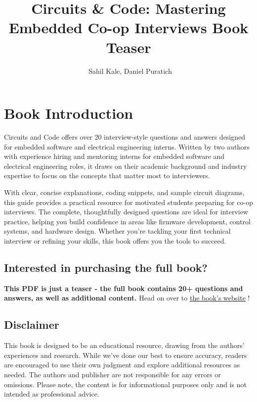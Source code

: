 \documentclass[letterpaper,11pt]{article}
\newcommand{\bluehref}[2]{%
    \textcolor{blue}{\underline{\href{#1}{#2}}}%
}
\newcommand{\newnoindentpara}{
    \par
    \noindent
}
\begin{document}
\title{Circuits \& Code: Mastering Embedded Co-op Interviews \newline Book Teaser}
\author{\textcopyright \ Sahil Kale, Daniel Puratich}
\setlength{\droptitle}{0.3\textheight} %
\maketitle %
\thispagestyle{empty} %
\newpage

\tableofcontents
\newpage

\section{Book Introduction}
Circuits and Code offers over 20 interview-style questions and answers designed for embedded software and electrical engineering interns. Written by two authors with experience hiring and mentoring interns for embedded software and electrical engineering roles, it draws on their academic background and industry expertise to focus on the concepts that matter most to interviewers. \newline

\newnoindentpara With clear, concise explanations, coding snippets, and sample circuit diagrams, this guide provides a practical resource for motivated students preparing for co-op interviews. The complete, thoughtfully designed questions are ideal for interview practice, helping you build confidence in areas like firmware development, control systems, and hardware design. Whether you’re tackling your first technical interview or refining your skills, this book offers you the tools to succeed.

\subsection{Interested in purchasing the full book?}
\textbf{This PDF is just a teaser - the full book contains 20+ questions and answers, as well as additional content.} Head on over to \bluehref{https://circuits-and-code.github.io/website}{the book's website}!

\subsection{Disclaimer}
This book is designed to be an educational resource, drawing from the authors' experiences and research. While we've done our best to ensure accuracy, readers are encouraged to use their own judgment and explore additional resources as needed. The authors and publisher are not responsible for any errors or omissions. Please note, the content is for informational purposes only and is not intended as professional advice. \newline

\newpage


\newpage

\newpage

\newpage


\printbibliography
\end{document}
